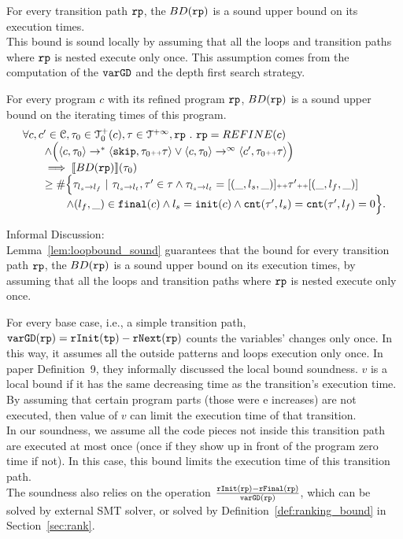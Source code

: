 For every transition path $\mathtt{rp}$, the $BD(\mathtt{rp})$
is a sound upper bound on its execution times.
\\
This bound is sound locally by assuming
that all the loops and transition paths where $\mathtt{rp}$ is nested execute only once.
This assumption comes from the computation of the $\mathtt{varGD}$ and the depth first search strategy.
\\
%
\begin{lemma}
    For every program $c$ with its refined program $\mathtt{rp}$,
    $BD(\mathtt{rp})$ is a sound upper bound on the iterating times of this program.
    \[
      \begin{array}{l}
      \forall c, c' \in \mathcal{C}, \mathtt{\tau}_0 \in \mathcal{T}^{+}_0(c), \mathtt{\tau} \in \mathcal{T}^{+\infty}, \mathtt{rp} ~.~ 
      \mathtt{rp} = REFINE(c)
      \\ \qquad
      \land 
      \Big(
        \langle c, \mathtt{\tau}_0 \rangle \to^* \langle \mathtt{skip}, \mathtt{\tau}_0 {\scriptscriptstyle ++} \mathtt{\tau} \rangle
        \lor \langle c, \mathtt{\tau}_0 \rangle \to^\infty \langle c', \mathtt{\tau}_0 {\scriptscriptstyle ++} \mathtt{\tau} \rangle 
        \Big)
      \\ \qquad
      \implies
      \llbracket BD(\mathtt{rp}) \rrbracket(\mathtt{\tau}_0) 
      \\ \qquad \geq 
      \# \Big\{\mathtt{\tau}_{l_s \to l_f} ~\vert~ \mathtt{\tau}_{l_s \to l_t}, \mathtt{\tau}' \in \mathtt{\tau} \land \mathtt{\tau}_{l_s \to l_t} = [(\_, l_s, \_)] {\scriptscriptstyle ++} \mathtt{\tau}' {\scriptscriptstyle ++} [(\_, l_f, \_)]
      \\ \qquad \qquad
      \land (l_{f}, \_) \in \mathtt{final}(c)
      \land l_s = \mathtt{init}(c)
      \land \mathtt{cnt}(\mathtt{\tau}', l_s) = \mathtt{cnt}(\mathtt{\tau}', l_f) = 0 
      \Big\}.
      \end{array}
    \]
    \end{lemma}
  Informal Discussion: \\
  Lemma~\ref{lem:loopbound_sound} guarantees that
  the bound for every transition path $\mathtt{rp}$, the $BD(\mathtt{rp})$
  is a sound upper bound on its execution times, by assuming
  that all the loops and transition paths where $\mathtt{rp}$ is nested execute only once.

For every base case, i.e., a simple transition path, 
$\mathtt{varGD}(\mathtt{rp}) =  \mathtt{rInit}(\mathtt{tp}) - \mathtt{rNext}(\mathtt{rp})$
counts the variables' changes only once. In this way, it assumes all the outside patterns and loops execution only once.
In paper \cite{sinn2017complexity} Definition~9, they informally discussed the local bound soundness.
$v$ is a local bound if it has the same decreasing time as the transition's execution time.
By assuming that certain program parts (those were e increases) are not executed,
then value of $v$ can limit the execution time of that transition.
\\
In our soundness, we assume all the code pieces not inside this transition path are executed at most once (once if they show up in front of the program
zero time if not).
In this case, this bound limits the execution time of this transition path.
\\
The soundness also relies on the operation $\frac{\mathtt{rInit}(\mathtt{rp}) - \mathtt{rFinal}(\mathtt{rp})}{\mathtt{varGD}(\mathtt{rp})}$,
which can be solved by external SMT solver,
or solved by Definition~\ref{def:ranking_bound} in Section~\ref{sec:rank}.

